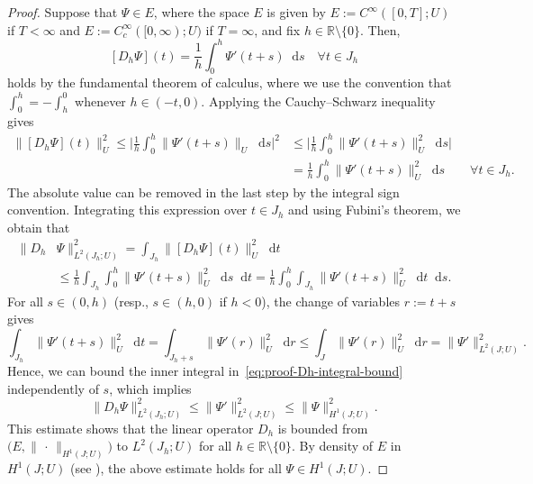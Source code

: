 \documentclass[reqno]{amsart}
\numberwithin{equation}{section}
\newcommand{\R}{\mathbb{R}}
\newcommand{\norm}[2]{     \| #1       \|_{ #2 }}
\newcommand{\rd}{\mathop{}\!\mathrm{d}}
\theoremstyle{remark}
\theoremstyle{definition}
\begin{document}
\begin{proof} 
	Suppose that 
	$\Psi \in E$, 
	where  the space $E$ is given by 
	$E:=C^\infty([0,T];U)$ if $T<\infty$ 
	and 
	$E:=C_c^\infty([0,\infty);U)$ if $T=\infty$, 
	and fix $h \in \R\setminus \{0\}$. 
	Then, 
	\begin{equation}\label{eq:FTC-Dh} 
	[D_h \Psi](t) 
	= 
	\frac{1}{h} 
	\int_{0}^h \Psi'(t+s) \rd s 
	\quad 
	\forall 
	t \in J_h
	\end{equation} 
	holds by the fundamental theorem of calculus, 
	where we use the convention that 
	$\int_0^h = -\int_h^0$ 
	whenever $h \in (-t, 0)$. 
	Applying the Cauchy--Schwarz inequality gives 
	\begin{align*}
	\norm{ [D_h \Psi](t) }{U}^2 
	\leq 
	\biggl| 
	\frac{1}{h} 
	\int_0^h \norm{ \Psi'(t+s) }{U} \rd s 
	\biggr|^2 
	&\leq 
	\biggl| 
	\frac{1}{h} 
	\int_0^h \norm{ \Psi'(t+s) }{U}^2 \rd s 
	\biggr| 
	\\ 
	&=  
	\frac{1}{h} 
	\int_0^h \norm{ \Psi'(t+s) }{U}^2 \rd s 
	\qquad 
	\forall t \in J_h. 
	\end{align*} 
	The absolute value can be removed 
	in the last step by the integral sign convention. 
	Integrating this expression 
	over $t \in J_h$ 
	and using Fubini's theorem, 
	we obtain that 
	\begin{equation}\label{eq:proof-Dh-integral-bound} 
	\begin{split} 
	\| D_h &\Psi \|_{L^2(J_h;U)}^2  
	=
	\int_{J_h} \norm{ [D_h \Psi](t) }{U}^2 \rd t 
	\\
	&\leq 
	\frac{1}{h} 
	\int_{J_h} \int_0^h \norm{ \Psi'(t+s) }{U}^2 \rd s \rd t 
	= 
	\frac{1}{h} 
	\int_0^h\int_{J_h} \norm{\Psi'(t+s)}{U}^2 \rd t \rd s.
	\end{split} 
	\end{equation}
	For all $s\in(0,h)$ (resp., $s\in (h,0)$ if $h<0$), 
	the change of variables $r := t+s$ gives  
	\[ 
	\int_{J_h} \norm{\Psi'(t+s)}{U}^2 \rd t 
	= 
	\int_{J_h + s} \norm{\Psi'(r)}{U}^2 \rd r 
	\leq 
	\int_J \norm{\Psi'(r)}{U}^2 \rd r 
	= 
	\norm{\Psi'}{L^2(J;U)}^2.
	\]
	Hence, we can bound the inner integral 
	in~\eqref{eq:proof-Dh-integral-bound} independently of $s$, 
	which implies 
	\begin{equation}\label{eq:DH-proof-h-uniform-bound} 
	\norm{D_h \Psi}{L^2(J_h;U)}^2 
	\leq 
	\norm{\Psi'}{L^2(J;U)}^2 
	\leq 
	\norm{\Psi}{H^1(J;U)}^2. 
	\end{equation}
	This estimate shows that the linear operator $D_h$ 
	is bounded from $\bigl( E, \norm{\,\cdot\,}{H^1(J;U)} \bigr)$ 
	to ${L^2(J_h;U)}$ for all $h \in \R\setminus\{0\}$. 
	By density of $E$ in $H^1(J;U)$ 
	(see \cite[XVIII.\S{1}.2, Lemma~1]{DautrayLionsVol5}), 
	the above estimate holds for all $\Psi \in H^1(J;U)$.
	

\end{proof}
\end{document}

